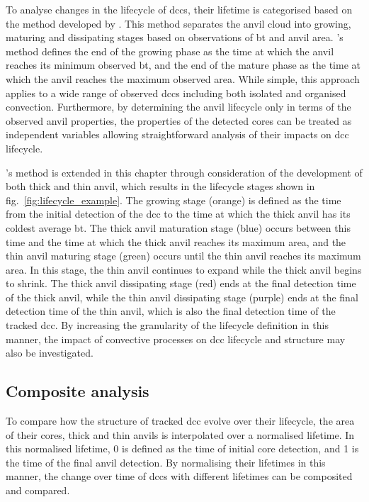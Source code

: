 To analyse changes in the lifecycle of \acrshort{dcc}s, their lifetime is categorised based on the method developed by \citet{futyan_deep_2007}.
This method separates the anvil cloud into growing, maturing and dissipating stages based on observations of \acrshort{bt} and anvil area.
\citeauthor{futyan_deep_2007}'s method defines the end of the growing phase as the time at which the anvil reaches its minimum observed \acrshort{bt}, and the end of the mature phase as the time at which the anvil reaches the maximum observed area.
While simple, this approach applies to a wide range of observed \acrshort{dcc}s including both isolated and organised convection.
Furthermore, by determining the anvil lifecycle only in terms of the observed anvil properties, the properties of the detected cores can be treated as independent variables allowing straightforward analysis of their impacts on \acrshort{dcc} lifecycle.

\citeauthor{futyan_deep_2007}'s method is extended in this chapter through consideration of the development of both thick and thin anvil, which results in the lifecycle stages shown in fig.~\ref{fig:lifecycle_example}.
The growing stage (orange) is defined as the time from the initial detection of the \acrshort{dcc} to the time at which the thick anvil has its coldest average \acrshort{bt}.
The thick anvil maturation stage (blue) occurs between this time and the time at which the thick anvil reaches its maximum area, and the thin anvil maturing stage (green) occurs until the thin anvil reaches its maximum area.
In this stage, the thin anvil continues to expand while the thick anvil begins to shrink.
The thick anvil dissipating stage (red) ends at the final detection time of the thick anvil, while the thin anvil dissipating stage (purple) ends at the final detection time of the thin anvil, which is also the final detection time of the tracked \acrshort{dcc}.
By increasing the granularity of the lifecycle definition in this manner, the impact of convective processes on \acrshort{dcc} lifecycle and structure may also be investigated.

\subsection{Composite analysis} \label{sec:composite_definition}

To compare how the structure of tracked \acrshort{dcc} evolve over their lifecycle, the area of their cores, thick and thin anvils is interpolated over a normalised lifetime.
In this normalised lifetime, 0 is defined as the time of initial core detection, and 1 is the time of the final anvil detection.
By normalising their lifetimes in this manner, the change over time of \acrshort{dcc}s with different lifetimes can be composited and compared.


